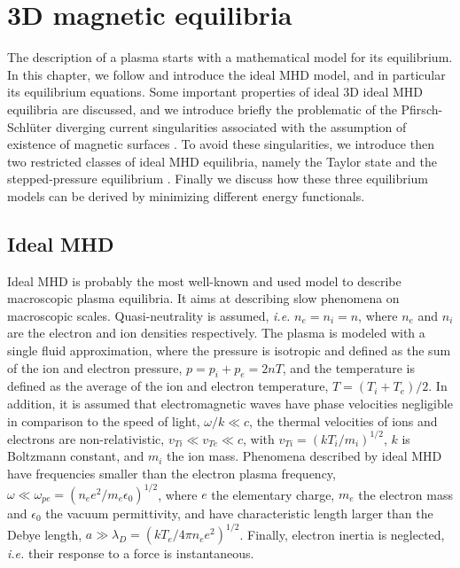 \documentclass[my_thesis.tex]{subfiles}
\begin{document}
\chapter{3D magnetic equilibria} \label{chap.3d magnetic equilibria}
The description of a plasma starts with a mathematical model for its equilibrium. In this chapter, we follow \citet{Freidberg2014} and introduce the ideal MHD model, and in particular its equilibrium equations. Some important properties of ideal 3D ideal MHD equilibria are discussed, and we introduce briefly the problematic of the Pfirsch-Schl\"uter diverging current singularities associated with the assumption of existence of magnetic surfaces \citep{Grad1967}. To avoid these singularities, we introduce then two restricted classes of ideal MHD equilibria, namely the Taylor state \citep{Taylor1974,Taylor1986} and the stepped-pressure equilibrium \citep{Hole2006}. Finally we discuss how these three equilibrium models can be derived by minimizing different energy functionals.

\section{Ideal MHD}
\label{section ideal mhd}
Ideal \ac{MHD} is probably the most well-known and used model to describe macroscopic plasma equilibria. It aims at describing slow phenomena on macroscopic scales. Quasi-neutrality is assumed, \textit{i.e.} $n_e=n_i=n$, where $n_e$ and $n_i$ are the electron and ion densities respectively. The plasma is modeled with a single fluid approximation, where the pressure is isotropic and defined as the sum of the ion and electron pressure, $p=p_i+p_e=2nT$, and the temperature is defined as the average of the ion and electron temperature, $T=(T_i+T_e)/2$. In addition, it is assumed that electromagnetic waves have phase velocities negligible in comparison to the speed of light, $\omega/k\ll c$, the thermal velocities of ions and electrons are non-relativistic, $v_{Ti}\ll v_{Te}\ll c$, with $v_{Ti}=(kT_i/m_i)^{1/2}$, $k$ is Boltzmann constant, and $m_i$ the ion mass. Phenomena described by ideal MHD have frequencies smaller than the electron plasma frequency, $\omega\ll \omega_{pe}=(n_ee^2/m_e\epsilon_0)^{1/2}$, where $e$ the elementary charge, $m_e$ the electron mass and $\epsilon_0$ the vacuum permittivity, and have characteristic length larger than the Debye length, $a\gg \lambda_D=(kT_e/4\pi n_e e^2)^{1/2}$. Finally, electron inertia is neglected, \textit{i.e.} their response to a force is instantaneous.
\end{document}
